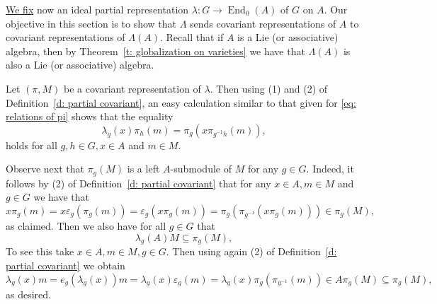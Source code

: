 \documentclass[11pt]{amsart}
\numberwithin{equation}{section}
\theoremstyle{definition}
\theoremstyle{remark}
\begin{document}
\underline{We fix} now  an ideal partial representation  \(\lambda: G \to \operatorname{End}_0(A)\) of $G$ on $A$.
Our objective in this section is to show that \(\Lambda\) sends covariant representations of \(A\) to covariant representations of \(\Lambda(A)\). Recall that if \(A\) is a Lie (or associative) algebra, then by Theorem~\ref{t: globalization on varieties} we have that \(\Lambda(A)\) is also a Lie (or associative) algebra.


Let $(\pi, M)$ be a covariant representation of $\lambda$.  Then using (1) and (2) of Definition~\ref{d: partial covariant}, an easy calculation similar to that given for \eqref{eq: relations of pi}  shows that the equality 
\begin{equation}\label{eq: relation of pi lambda}
    \lambda_g(x) \pi_h(m) = \pi_g(x \pi_{g^{-1}h}(m)),
\end{equation}  holds for all $g,h \in G, x \in A$ and $m \in M.$ 

Observe next  that $\pi _g (M)$ is a left $A$-submodule of $M$ for any $g\in G .$ Indeed,
it follows by (2) of Definition~\ref{d: partial covariant} that for any $x\in A, m \in M$ and $g\in G$ we have that
$$x \pi _g (m) =  x \varepsilon _g (\pi _g (m))=
\varepsilon _g (x \pi _g (m))= \pi_{g} (\pi _{g^{-1}} (x \pi _g (m)))\in \pi _g(M),$$ 
as claimed. Then we also have for all $g\in G$ that 
\begin{equation}\label{eq: action of lambda_g (A) }
\lambda _g(A) M \subseteq \pi _g (M),
\end{equation}   To see this take  $x\in A, m \in M, g \in G.$ Then using  again (2) of Definition~\ref{d: partial covariant} we obtain
$$\lambda _g (x) m = e_g( \lambda _g (x)) m  
=  \lambda _g (x) \varepsilon _g (m) =
\lambda _g (x) \pi _g (\pi _{g^{-1}} (m))\in A \pi _g (M) \subseteq \pi _g (M), $$ as desired.
\end{document}
